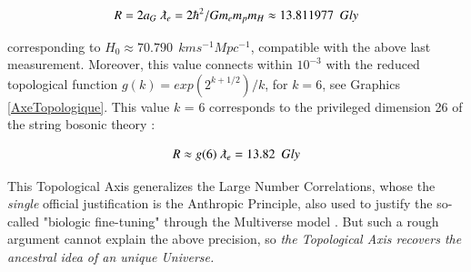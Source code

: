 \documentclass[a4paper,9pt]{article}
\begin{document}
\begin{equation}
R =2a_G ~\lambdabar_e  = 2 \hbar^2/Gm_e m_p m_H \approx 13.811977~~Gly 
 \end{equation}


corresponding to  $ H_0 \approx 70.790 ~~ km s^{-1} Mpc^{-1}$, compatible with the above last measurement. Moreover, this value connects within $10^{-3}$ with the reduced topological function $g(k) = exp(2^{k+1/2})/k$, for $k = 6 $, see Graphics \ref{AxeTopologique}. This value $k$ = 6  corresponds to the privileged dimension 26 of the string bosonic theory :  


\begin{equation}
R \approx g(6)~\lambdabar_e  = 13.82~~Gly
 \end{equation}


This Topological Axis generalizes the Large Number Correlations, whose the \textit{single} official justification is the Anthropic Principle, also used to justify the so-called "biologic fine-tuning" through the Multiverse model \cite {Rees}. But such a rough argument cannot explain the above precision, so \textit{the Topological Axis recovers the ancestral idea of an unique Universe.} 








%
\end{document}
